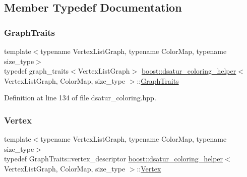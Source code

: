 \subsection{Member Typedef Documentation}
\mbox{\label{classboost_1_1dsatur__coloring__helper_a2e9fc525ccf3c7378f250043fccccd34}} 
\subsubsection{\texorpdfstring{Graph\+Traits}{GraphTraits}}
{\footnotesize\ttfamily template$<$typename Vertex\+List\+Graph, typename Color\+Map, typename size\+\_\+type$>$ \\
typedef graph\+\_\+traits$<$Vertex\+List\+Graph$>$ \hyperlink{classboost_1_1dsatur__coloring__helper}{boost\+::dsatur\+\_\+coloring\+\_\+helper}$<$ Vertex\+List\+Graph, Color\+Map, size\+\_\+type $>$\+::\hyperlink{classboost_1_1dsatur__coloring__helper_a2e9fc525ccf3c7378f250043fccccd34}{Graph\+Traits}\hspace{0.3cm}{\ttfamily [private]}}



Definition at line 134 of file dsatur\+\_\+coloring.\+hpp.

\mbox{\label{classboost_1_1dsatur__coloring__helper_a7d628ed652e8500d17a93c38ab37e24b}} 
\subsubsection{\texorpdfstring{Vertex}{Vertex}}
{\footnotesize\ttfamily template$<$typename Vertex\+List\+Graph, typename Color\+Map, typename size\+\_\+type$>$ \\
typedef Graph\+Traits\+::vertex\+\_\+descriptor \hyperlink{classboost_1_1dsatur__coloring__helper}{boost\+::dsatur\+\_\+coloring\+\_\+helper}$<$ Vertex\+List\+Graph, Color\+Map, size\+\_\+type $>$\+::\hyperlink{classboost_1_1dsatur__coloring__helper_a7d628ed652e8500d17a93c38ab37e24b}{Vertex}\hspace{0.3cm}{\ttfamily [private]}}



